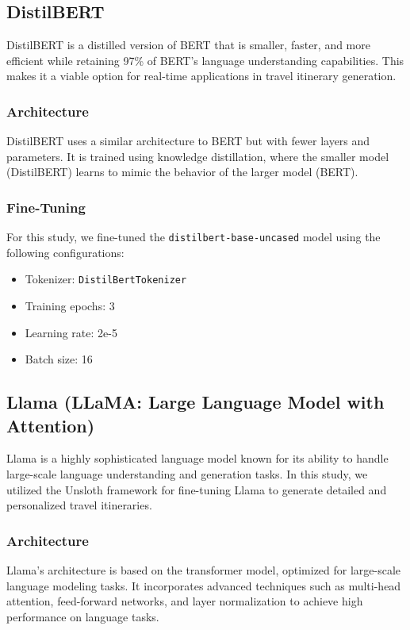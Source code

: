 \documentclass[conference]{IEEEtran}
\begin{document}
\subsection{DistilBERT}

DistilBERT is a distilled version of BERT that is smaller, faster, and more efficient while retaining 97\% of BERT's language understanding capabilities. This makes it a viable option for real-time applications in travel itinerary generation.

\subsubsection{Architecture}
DistilBERT uses a similar architecture to BERT but with fewer layers and parameters. It is trained using knowledge distillation, where the smaller model (DistilBERT) learns to mimic the behavior of the larger model (BERT).

\subsubsection{Fine-Tuning}
For this study, we fine-tuned the \texttt{distilbert-base-uncased} model using the following configurations:
\begin{itemize}
    \item Tokenizer: \texttt{DistilBertTokenizer}
    \item Training epochs: 3
    \item Learning rate: 2e-5
    \item Batch size: 16
\end{itemize}

\subsection{Llama (LLaMA: Large Language Model with Attention)}

Llama is a highly sophisticated language model known for its ability to handle large-scale language understanding and generation tasks. In this study, we utilized the Unsloth framework for fine-tuning Llama to generate detailed and personalized travel itineraries.

\subsubsection{Architecture}
Llama's architecture is based on the transformer model, optimized for large-scale language modeling tasks. It incorporates advanced techniques such as multi-head attention, feed-forward networks, and layer normalization to achieve high performance on language tasks.
\end{document}
